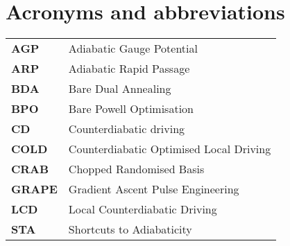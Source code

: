 \chapter{Acronyms and abbreviations}

\begin{table}[h]
      \begin{tabular}{p{3cm}  p{8cm}}

        \textbf{AGP}\label{acr:AGP} & Adiabatic Gauge Potential \\ [7pt]
        \textbf{ARP}\label{acr:ARP} & Adiabatic Rapid Passage \\ [7pt]
        \textbf{BDA}\label{acr:BDA} & Bare Dual Annealing \\[7pt]
        \textbf{BPO}\label{acr:BPO} & Bare Powell Optimisation \\[7pt]
        \textbf{CD}\label{acr:CD} & Counterdiabatic driving \\[7pt]
        \textbf{COLD}\label{acr:COLD} & Counterdiabatic Optimised Local Driving \\[7pt]
        \textbf{CRAB}\label{acr:CRAB} & Chopped Randomised Basis \\ [7pt]
        \textbf{GRAPE}\label{acr:GRAPE} & Gradient Ascent Pulse Engineering \\ [7pt]
        \textbf{LCD}\label{acr:LCD} & Local Counterdiabatic Driving \\[7pt]
        \textbf{STA}\label{acr:STA} & Shortcuts to Adiabaticity \\[7pt]

    \end{tabular}

\end{table}\label{table}